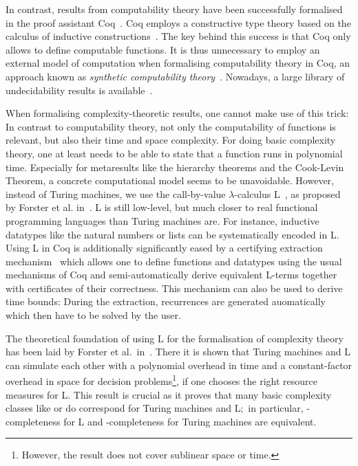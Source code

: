 In contrast, results from computability theory have been successfully formalised in the proof assistant Coq~\cite{coqweb}. 
Coq employs a constructive type theory based on the calculus of inductive constructions~\cite{iclnotes}. The key behind this success is that Coq only allows to define computable functions. 
It is thus unnecessary to employ an external model of computation when formalising computability theory in Coq, an approach known as \textit{synthetic computability theory}~\cite{ForsterEtAl:2018:On-Synthetic-Undecidability}. 
Nowadays, a large library of undecidability results is available~\cite{coq_undec}. 

When formalising complexity-theoretic results, one cannot make use of this trick: In contrast to computability theory, not only the computability of functions is relevant, but also their time and space complexity. For doing basic complexity theory, one at least needs to be able to state that a function runs in polynomial time.
Especially for metaresults like the hierarchy theorems and the Cook-Levin Theorem, a concrete computational model seems to be unavoidable.
However, instead of Turing machines, we use the call-by-value $\lambda$-calculus L~\cite{ForsterSmolka:2017:L-Computability}, as proposed by Forster et al. in~\cite{ForsterEtAl:2019:VerifiedTMs}. L is still low-level, but much closer to real functional programming languages than Turing machines are. For instance, inductive datatypes like the natural numbers or lists can be systematically encoded in L.
Using L in Coq is additionally significantly eased by a certifying extraction mechanism~\cite{ForsterKunze:2019:Certifying-extraction} which allows one to define functions and datatypes using the usual mechanisms of Coq and semi-automatically derive equivalent L-terms together with certificates of their correctness. This mechanism can also be used to derive time bounds: During the extraction, recurrences are generated auomatically which then have to be solved by the user. 

The theoretical foundation of using L for the formalisation of complexity theory has been laid by Forster et al.\ in~\cite{ForsterKunzeRoth:2019:wcbv-Reasonable}. There it is shown that Turing machines and L can simulate each other with a polynomial overhead in time and a constant-factor overhead in space for decision problems\footnote{However, the result does not cover sublinear space or time.}, if one chooses the right resource measures for L.
This result is crucial as it proves that many basic complexity classes like \NP{} or \PC{} do correspond for Turing machines and L;\ in particular, \NP{}-completeness for L and \NP{}-completeness for Turing machines are equivalent.

